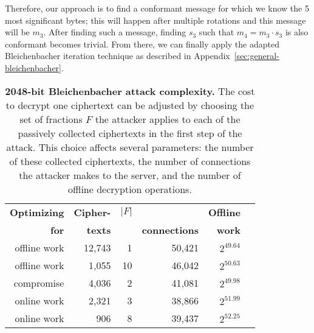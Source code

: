 Therefore, our approach is to find a conformant message for which we know the 5 most significant bytes; this will happen after multiple rotations and
this message will be $m_3$.
After finding such a message, finding $s_3$ such that $m_4 = m_3 \cdot s_3$ is also conformant becomes trivial.
From there, we can finally apply the adapted Bleichenbacher iteration technique as described in Appendix~\ref{sec:general-bleichenbacher}.

\begin{table}[t]
  \centering
	\begin{tabular}{rrrrrr}
	\toprule
	\textbf{Optimizing} & \textbf{Cipher-} & \textbf{$|F|$}     & \textbf{\ssltwo}  & \textbf{Offline} \\
        \textbf{for}        & \textbf{texts}   &           & \textbf{connections} & \textbf{work} \\
	\midrule
	offline work        &           12,743 &          1 &            50,421  & $2^{49.64}$ \\
        offline work        &            1,055 &         10 &              46,042  & $2^{50.63}$ \\
       	compromise          &            4,036 &          2 &              41,081  & $2^{49.98}$ \\
	online work         &            2,321 &          3 &              38,866  & $2^{51.99}$ \\
	online work         &              906 &          8 &              39,437  & $2^{52.25}$ \\
	\bottomrule
	\end{tabular}
        \caption{\textbf{2048-bit Bleichenbacher attack complexity.} The cost to decrypt one ciphertext can be adjusted by choosing the set of fractions $F$ the attacker applies to each of the passively collected ciphertexts in the first step of the attack. This choice affects several parameters: the number of these collected ciphertexts, the number of connections the attacker makes to the \ssltwo server, and the number of offline decryption operations.}%
        \label{tab:reasonable_parameters}
\end{table}

